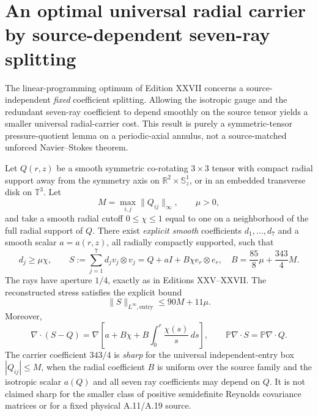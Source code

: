 
\section{An optimal universal radial carrier by source-dependent seven-ray splitting}
\label{sec:xxviii-sharp-source-dependent}
The linear-programming optimum of Edition XXVII concerns a
source-independent \emph{fixed} coefficient splitting. Allowing the
isotropic gauge and the redundant seven-ray coefficient to depend
smoothly on the source tensor yields a smaller universal radial-carrier
cost. This result is purely a symmetric-tensor pressure-quotient
lemma on a periodic-axial annulus, not a source-matched unforced
Navier--Stokes theorem.

\begin{theorem}
\label{thm:xxviii-sharp-universal}
Let $Q(r,z)$ be a smooth symmetric co-rotating $3\times3$ tensor
with compact radial support away from the symmetry axis on
$\mathbb R^2\times\mathbb S^1_z$, or in an embedded transverse
disk on $\mathbb T^3$. Let
\[
M=\max_{i,j}\|Q_{ij}\|_\infty,\qquad \mu>0,
\]
and take a smooth radial cutoff $0\le\chi\le1$ equal to one
on a neighborhood of the full radial support of $Q$.
There exist \emph{explicit smooth} coefficients $d_1,\ldots,d_7$
and a smooth scalar $a=a(r,z)$, all radially compactly
supported, such that
\begin{equation}\label{eq:xxviii-exact-stress}
\boxed{
d_j\ge\mu\chi,\qquad
S:=\sum_{j=1}^7d_jv_j\otimes v_j
=Q+aI+B\chi e_r\otimes e_r,\quad
B=\frac{85}{8}\mu+\frac{343}{4}M.
}
\end{equation}
The rays have aperture $1/4$, exactly as in Editions XXV--XXVII.
The reconstructed stress satisfies the explicit bound
\begin{equation}\label{eq:xxviii-supbound}
\boxed{\quad
\|S\|_{L^\infty,\mathrm{entry}}\le90M+11\mu.\quad}
\end{equation}
Moreover,
\begin{equation}\label{eq:xxviii-projected}
\nabla\cdot(S-Q)
=\nabla\left[a+B\chi+B\int_0^r\frac{\chi(s)}s\,ds\right],
\qquad
\mathbb P\nabla\cdot S=\mathbb P\nabla\cdot Q.
\end{equation}
The carrier coefficient $343/4$ is \emph{sharp} for the universal
independent-entry box $|Q_{ij}|\le M$, when the radial coefficient
$B$ is uniform over the source family and the isotropic scalar
$a(Q)$ and all seven ray coefficients may depend on $Q$.
It is not claimed sharp for the smaller class of positive
semidefinite Reynolds covariance matrices or for a fixed
physical A.11/A.19 source.
\end{theorem}

